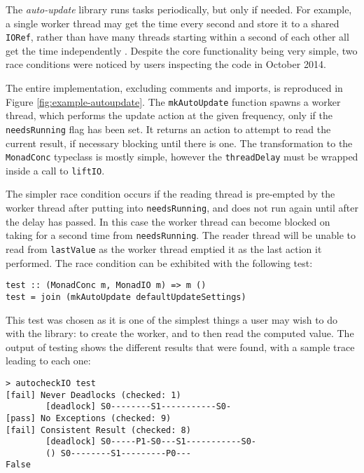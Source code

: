 The \emph{auto-update} library runs tasks periodically, but only if
needed. For example, a single worker thread may get the time every
second and store it to a shared \verb|IORef|, rather than have many
threads starting within a second of each other all get the time
independently \citep{autoupdate}. Despite the core functionality being
very simple, two race conditions were noticed by users inspecting the
code in October 2014.



The entire implementation, excluding comments and imports, is
reproduced in Figure \ref{fig:example-autoupdate}. The
\verb|mkAutoUpdate| function spawns a worker thread, which performs
the update action at the given frequency, only if the
\verb|needsRunning| flag has been set. It returns an action to attempt
to read the current result, if necessary blocking until there is
one. The transformation to the \verb|MonadConc| typeclass is mostly
simple, however the \verb|threadDelay| must be wrapped inside a call
to \verb|liftIO|.

The simpler race condition occurs if the reading thread is pre-empted
by the worker thread after putting into \verb|needsRunning|, and does
not run again until after the delay has passed. In this case the
worker thread can become blocked on taking for a second time from
\verb|needsRunning|. The reader thread will be unable to read from
\verb|lastValue| as the worker thread emptied it as the last action it
performed. The race condition can be exhibited with the following
test:

\begin{verbatim}
test :: (MonadConc m, MonadIO m) => m ()
test = join (mkAutoUpdate defaultUpdateSettings)
\end{verbatim}

This test was chosen as it is one of the simplest things a user may
wish to do with the library: to create the worker, and to then read
the computed value. The output of testing shows the different results
that were found, with a sample trace leading to each one:

\begin{verbatim}
> autocheckIO test
[fail] Never Deadlocks (checked: 1)
        [deadlock] S0--------S1-----------S0-
[pass] No Exceptions (checked: 9)
[fail] Consistent Result (checked: 8)
        [deadlock] S0-----P1-S0---S1-----------S0-
        () S0--------S1---------P0---
False
\end{verbatim}

